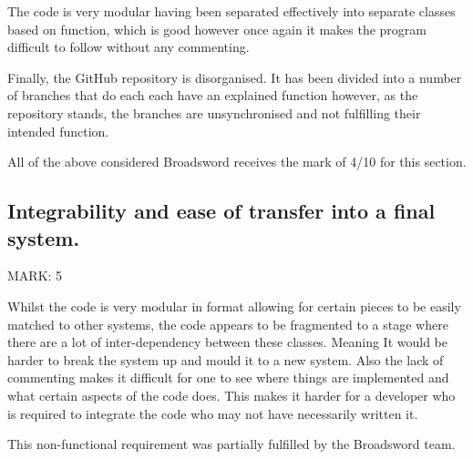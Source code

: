 \documentclass{article}
\begin{document}
\begin{flushleft}
The code is very modular having been separated effectively into separate classes based on function, which is good however once again it makes the program difficult to follow without any commenting.
\end{flushleft}

\begin{flushleft}
Finally, the GitHub repository is disorganised. It has been divided into a number of branches that do each each have an explained function however, as the repository stands, the branches are unsynchronised and not fulfilling their intended function.
\end{flushleft}

\begin{flushleft}
All of the above considered Broadsword receives the mark of 4/10 for this section.
\end{flushleft}


\subsection{Integrability and ease of transfer into a final system.}
\begin{flushleft}
MARK: 5
\end{flushleft}

\begin{flushleft}
Whilst the code is very modular in format allowing for certain pieces to be easily matched to other systems, the code appears to be fragmented to a stage where there are a lot of inter-dependency between these classes. Meaning It would be harder to break the system up and mould it to a new system. Also the lack of commenting makes it difficult for one to see where things are implemented and what certain aspects of the code does. This makes it harder for a developer who is required to integrate the code who may not have necessarily written it.
\end{flushleft}

\begin{flushleft}
This non-functional requirement was partially fulfilled by the Broadsword team.
\end{flushleft}
\end{document}
